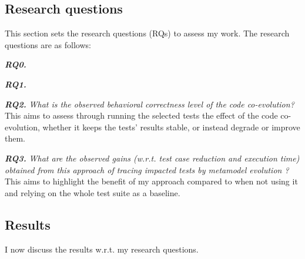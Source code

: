 \subsection{Research questions}
This section sets the research questions (RQs) to assess my work. The research questions are as follows:


\textbf{\emph{RQ0.}}  

\textbf{\emph{RQ1.}}   %

\textbf{\emph{RQ2.}} \emph{What is the observed behavioral correctness level of the code co-evolution?} This aims to assess through running the selected tests the effect of the code co-evolution, whether it keeps the tests' results stable, or instead degrade or improve them. %


\textbf{\emph{RQ3.}} \emph{What are the observed gains (w.r.t. test case reduction and execution time) obtained from this approach of tracing impacted tests by metamodel evolution ?} This aims to highlight the benefit of my approach compared to when not using it and relying on the whole test suite as a baseline. 


\subsection{Results}
I now discuss the results w.r.t. my research questions.

